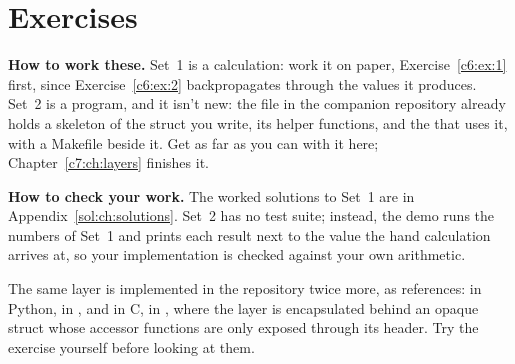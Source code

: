 
\section{Exercises}
\label{c6:sec:exercises}

\begin{aside}
\textbf{How to work these.} Set~1 is a calculation: work it on paper, Exercise~\ref{c6:ex:1}
first, since Exercise~\ref{c6:ex:2} backpropagates through the values it produces. Set~2 is a
program, and it isn't new: the file  in the
companion repository already holds a skeleton of the struct you write, its helper functions, and
the  that uses it, with a Makefile beside it. Get as far as you can with it here;
Chapter~\ref{c7:ch:layers} finishes it.

\textbf{How to check your work.} The worked solutions to Set~1 are in
Appendix~\ref{sol:ch:solutions}. Set~2 has no test suite; instead, the demo runs the numbers of
Set~1 and prints each result next to the value the hand calculation arrives at, so your
implementation is checked against your own arithmetic.

The same layer is implemented in the repository twice more, as references: in Python, in
, and in C, in , where the
layer is encapsulated behind an opaque struct whose accessor functions are only exposed through its
header. Try the exercise yourself before looking at them.
\end{aside}

